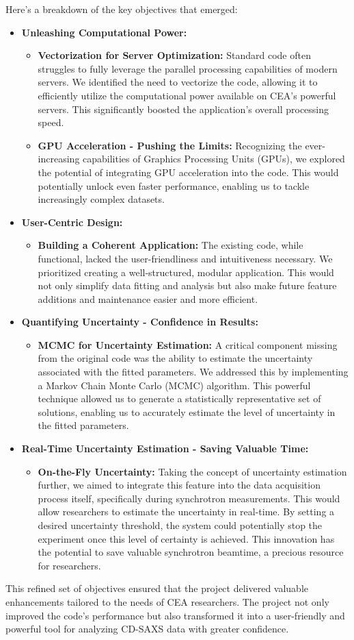 Here's a breakdown of the key objectives that emerged:

\begin{itemize}
    \item \textbf{Unleashing Computational Power:}
    \begin{itemize}
        \item \textbf{Vectorization for Server Optimization:} Standard code often struggles to fully leverage the parallel processing capabilities of modern servers. We identified the need to vectorize the code, allowing it to efficiently utilize the computational power available on CEA's powerful servers. This significantly boosted the application's overall processing speed.
        \item \textbf{GPU Acceleration - Pushing the Limits:} Recognizing the ever-increasing capabilities of Graphics Processing Units (GPUs), we explored the potential of integrating GPU acceleration into the code. This would potentially unlock even faster performance, enabling us to tackle increasingly complex datasets.
    \end{itemize}
    \item \textbf{User-Centric Design:}
    \begin{itemize}
        \item \textbf{Building a Coherent Application:} The existing code, while functional, lacked the user-friendliness and intuitiveness necessary. We prioritized creating a well-structured, modular application. This would not only simplify data fitting and analysis but also make future feature additions and maintenance easier and more efficient.
    \end{itemize}
    \item \textbf{Quantifying Uncertainty - Confidence in Results:}
    \begin{itemize}
        \item \textbf{MCMC for Uncertainty Estimation:} A critical component missing from the original code was the ability to estimate the uncertainty associated with the fitted parameters. We addressed this by implementing a Markov Chain Monte Carlo (MCMC) algorithm. This powerful technique allowed us to generate a statistically representative set of solutions, enabling us to accurately estimate the level of uncertainty in the fitted parameters.
    \end{itemize}
    \item \textbf{Real-Time Uncertainty Estimation - Saving Valuable Time:}
    \begin{itemize}
        \item \textbf{On-the-Fly Uncertainty:} Taking the concept of uncertainty estimation further, we aimed to integrate this feature into the data acquisition process itself, specifically during synchrotron measurements. This would allow researchers to estimate the uncertainty in real-time. By setting a desired uncertainty threshold, the system could potentially stop the experiment once this level of certainty is achieved. This innovation has the potential to save valuable synchrotron beamtime, a precious resource for researchers.
    \end{itemize}
\end{itemize}

This refined set of objectives ensured that the project delivered valuable enhancements tailored to the needs of CEA researchers. The project not only improved the code's performance but also transformed it into a user-friendly and powerful tool for analyzing CD-SAXS data with greater confidence.
